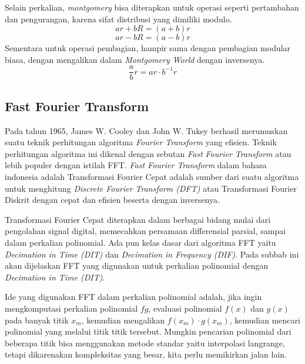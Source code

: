 Selain perkalian, \textit{montgomery} bisa diterapkan untuk operasi seperti pertambahan dan pengurangan, karena sifat distribusi yang dimiliki modulo.
$$ ar + bR = (a+b)r $$
$$ ar - bR = (a-b)r $$
Sementara untuk operasi pembagian, hampir sama dengan pembagian modular biasa, dengan mengalikan dalam \textit{Montgomery World} dengan inversenya.
$$ \frac{a}{b}r = ar \cdot b^{-1}r $$

\subsection{ Fast Fourier Transform}
Pada tahun 1965, James W. Cooley dan John W. Tukey berhasil merumuskan suatu teknik perhitungan algoritma \textit{Fourier Transform} yang efisien\cite{fft}. Teknik perhitungan algoritma ini dikenal dengan sebutan \textit{Fast Fourier Transform} atau lebih populer dengan istilah FFT. \textit{Fast Fourier Transform} dalam bahasa indonesia adalah Transformasi Fourier Cepat adalah sumber dari suatu algoritma untuk menghitung \textit{Discrete Fourier Transform (DFT)} atau Transformasi Fourier Diskrit dengan cepat dan efisien beserta dengan inversenya.

Transformasi Fourier Cepat diterapkan dalam berbagai bidang mulai dari pengolahan signal digital, memecahkan persamaan differensial parsial, sampai dalam perkalian polinomial. Ada pun kelas dasar dari algoritma FFT yaitu \textit{Decimation in Time (DIT)} dan \textit{Decimation in Frequency (DIF)}. Pada subbab ini akan dijelaskan FFT yang digunakan untuk perkalian polinomial dengan \textit{Decimation in Time (DIT)}.

Ide yang digunakan FFT dalam perkalian polinomial adalah, jika ingin mengkomputasi perkalian polinomial $ fg $, evaluasi polinomial $ f(x) $ dan $ g(x) $ pada banyak titik $ x_m $, kemudian mengalikan $ f(x_m) \cdot g(x_m) $, kemudian mencari polinomial yang melalui titik titik tersebut. Mungkin pencarian polinomial dari beberapa titik bisa menggunakan metode standar yaitu interpolasi langrange, tetapi dikarenakan kompleksitas yang besar, kita perlu memikirkan jalan lain.

